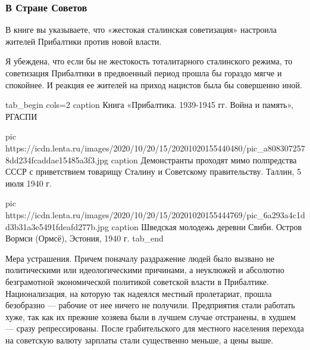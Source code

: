  
 
 
 
 
\clearpage
\subsubsection{В Стране Советов}
\label{sec:02_12_2020.news.ru.lenta_ru.mozzhuhin_andrei.1.pribaltika.v_strane_sovetov}

В книге вы указываете, что «жестокая сталинская советизация» настроила жителей
Прибалтики против новой власти.

Я убеждена, что если бы не жестокость тоталитарного сталинского режима, то
советизация Прибалтики в предвоенный период прошла бы гораздо мягче и
спокойнее. И реакция ее жителей на приход нацистов была бы совершенно иной.

\ifcmt
tab_begin cols=2
	caption Книга «Прибалтика. 1939-1945 гг. Война и память», РГАСПИ

	pic https://icdn.lenta.ru/images/2020/10/20/15/20201020155440480/pic_a8083072578dd234fcaddae15485a3f3.jpg
	caption Демонстранты проходят мимо полпредства СССР с приветствием товарищу Сталину и Советскому правительству. Таллин, 5 июля 1940 г. 

	pic https://icdn.lenta.ru/images/2020/10/20/15/20201020155444769/pic_6a293a4c1dd3b31a3e5491fdeafd277b.jpg
	caption Шведская молодежь деревни Свиби. Остров Вормси (Ормсё), Эстония, 1940 г.
tab_end
\fi


Мера устрашения. Причем поначалу раздражение людей было вызвано не
политическими или идеологическими причинами, а неуклюжей и абсолютно
безграмотной экономической политикой советской власти в Прибалтике.
Национализация, на которую так надеялся местный пролетариат, прошла безобразно
— рабочие от нее ничего не получили. Предприятия стали работать хуже, так как
их прежние хозяева были в лучшем случае отстранены, в худшем — сразу
репрессированы. После грабительского для местного населения перехода на
советскую валюту зарплаты стали существенно меньше, а цены выше.


